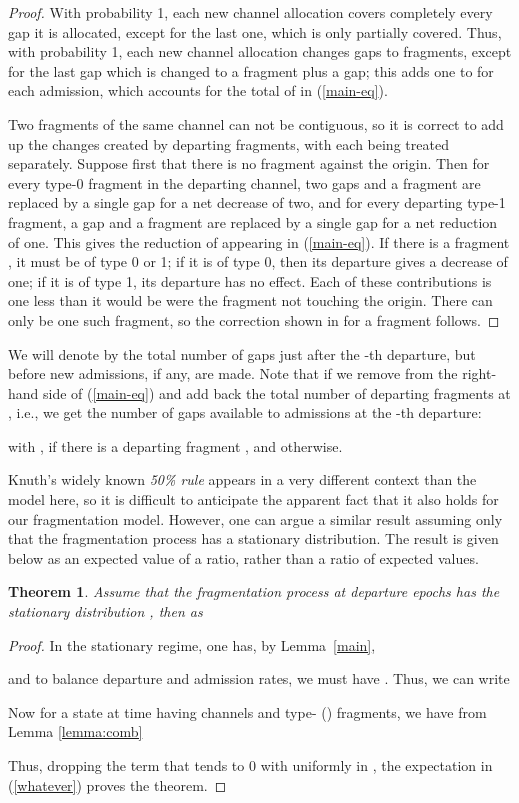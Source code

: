 \documentclass{amsart}
\newtheorem{theorem}{Theorem}
\begin{document}
\begin{proof}
With probability 1, each new channel allocation covers completely
every gap it is allocated, except for the last one, which is only
partially covered. Thus, with probability 1, each new channel
allocation changes gaps to fragments, except for the last gap which
is changed to a fragment plus a gap; this adds one to
 for each admission,
which accounts for the total of  in (\ref{main-eq}).

Two fragments of the same channel can not be contiguous, so it is
correct to add up the changes created by departing fragments, with
each being treated separately.  Suppose first that there is no
fragment  against the origin. Then for every type-0 fragment in
the departing channel, two gaps and a fragment are replaced by a
single gap for a net decrease of two, and for every departing type-1
fragment, a gap and a fragment are replaced by a single gap for a
net reduction of one. This gives the reduction of  appearing in (\ref{main-eq}).  If there is a fragment
, it must be of type 0 or 1; if it is of type 0, then its
departure gives a decrease of one; if it is of type 1, its departure
has no effect.  Each of these contributions is one less than it
would be were the fragment not touching the origin.  There can only
be one such fragment, so the correction shown in  for a
fragment  follows.
\end{proof}

We will denote by   the total number of
gaps just after the -th departure, but before new admissions, if
any, are made. Note that if we remove  from the right-hand
side of (\ref{main-eq}) and add back the total number of departing
fragments at , i.e.,  we get the
number of gaps available to admissions at the -th departure:
 
with , if there is a departing fragment , and 
otherwise.

Knuth's widely known \textit{50\% rule} appears in a very different
context than the model here, so it is difficult to anticipate the
apparent fact that it also holds for our fragmentation model.
However, one can argue a similar result assuming only that the
fragmentation process has a stationary distribution.  The result is given
below as an expected value of a ratio, rather than a ratio of expected
values.
\begin{theorem}\label{stab-Har}
Assume that the fragmentation process at departure epochs  has the
stationary distribution , then as 

\end{theorem}
\begin{proof}
In the stationary regime, one has, by Lemma~\ref{main},

and to balance departure and admission rates, we must have
.  Thus, we can write

Now for a state  at time  having  channels and 
type- () fragments, we have from Lemma \ref{lemma:comb}

Thus, dropping the   term that tends to 0 with  uniformly in , the
expectation in (\ref{whatever}) proves the theorem.
\end{proof}
\end{document}
